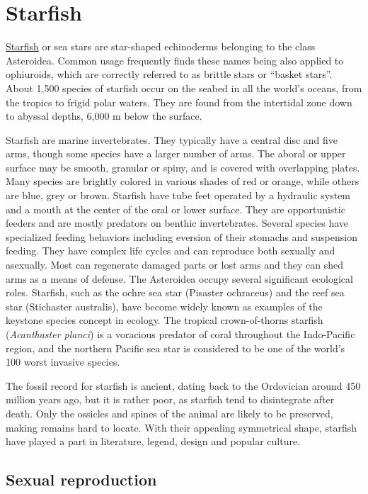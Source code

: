\section{Starfish}\label{starfish}

\href{https://en.wikipedia.org/wiki/Starfish}{Starfish} or sea stars are
star-shaped echinoderms belonging to the class Asteroidea. Common usage
frequently finds these names being also applied to ophiuroids, which are
correctly referred to as brittle stars or ``basket stars''. About 1,500
species of starfish occur on the seabed in all the world's oceans, from
the tropics to frigid polar waters. They are found from the intertidal
zone down to abyssal depths, 6,000 m below the surface.

Starfish are marine invertebrates. They typically have a central disc
and five arms, though some species have a larger number of arms. The
aboral or upper surface may be smooth, granular or spiny, and is covered
with overlapping plates. Many species are brightly colored in various
shades of red or orange, while others are blue, grey or brown. Starfish
have tube feet operated by a hydraulic system and a mouth at the center
of the oral or lower surface. They are opportunistic feeders and are
mostly predators on benthic invertebrates. Several species have
specialized feeding behaviors including eversion of their stomachs and
suspension feeding. They have complex life cycles and can reproduce both
sexually and asexually. Most can regenerate damaged parts or lost arms
and they can shed arms as a means of defense. The Asteroidea occupy
several significant ecological roles. Starfish, such as the ochre sea
star (Pisaster ochraceus) and the reef sea star (Stichaster australis),
have become widely known as examples of the keystone species concept in
ecology. The tropical crown-of-thorns starfish (\emph{Acanthaster planci}) is a
voracious predator of coral throughout the Indo-Pacific region, and the
northern Pacific sea star is considered to be one of the world's 100
worst invasive species.

The fossil record for starfish is ancient, dating back to the Ordovician
around 450 million years ago, but it is rather poor, as starfish tend to
disintegrate after death. Only the ossicles and spines of the animal are
likely to be preserved, making remains hard to locate. With their
appealing symmetrical shape, starfish have played a part in literature,
legend, design and popular culture.

\subsection{Sexual reproduction}\label{sexual-reproduction-1}

